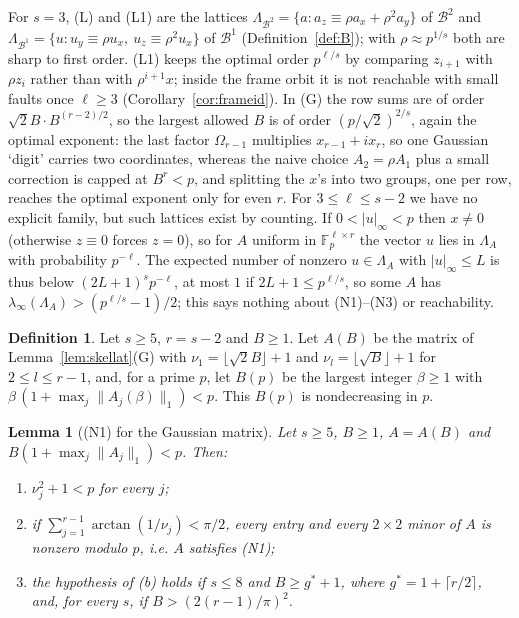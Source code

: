 \documentclass[11pt]{amsart}
\newtheorem{lemma}[theorem]{Lemma}
\theoremstyle{definition}
\newtheorem{definition}[theorem]{Definition}
\theoremstyle{plain}
\newcommand{\F}{\mathbb{F}}
\begin{document}
For $s=3$, (L) and (L1) are the lattices $\Lambda_{\mathcal B^2}=\{a:a_z\equiv\rho a_x+\rho^2a_y\}$ of $\mathcal B^2$ and $\Lambda_{\mathcal B^1}=\{u:u_y\equiv\rho u_x,\ u_z\equiv\rho^2u_x\}$ of $\mathcal B^1$ (Definition~\ref{def:B}); with $\rho\approx p^{1/s}$ both are sharp to first order. (L1) keeps the optimal order $p^{\ell/s}$ by comparing $z_{i+1}$ with $\rho z_i$ rather than with $\rho^{i+1}x$; inside the frame orbit it is not reachable with small faults once $\ell\ge3$ (Corollary~\ref{cor:frameid}). In (G) the row sums are of order $\sqrt2B\cdot B^{(r-2)/2}$, so the largest allowed $B$ is of order $(p/\sqrt2)^{2/s}$, again the optimal exponent: the last factor $\Omega_{r-1}$ multiplies $x_{r-1}+ix_r$, so one Gaussian `digit' carries two coordinates, whereas the naive choice $A_2=\rho A_1$ plus a small correction is capped at $B^r<p$, and splitting the $x$'s into two groups, one per row, reaches the optimal exponent only for even $r$. For $3\le \ell\le s-2$ we have no explicit family, but such lattices exist by counting. If $0<|u|_\infty<p$ then $x\ne0$ (otherwise $z\equiv0$ forces $z=0$), so for $A$ uniform in $\F_p^{\ell\times r}$ the vector $u$ lies in $\Lambda_A$ with probability $p^{-\ell}$. The expected number of nonzero $u\in\Lambda_A$ with $|u|_\infty\le L$ is thus below $(2L+1)^sp^{-\ell}$, at most $1$ if $2L+1\le p^{\ell/s}$, so some $A$ has $\lambda_\infty(\Lambda_A)>(p^{\ell/s}-1)/2$; this says nothing about (N1)--(N3) or reachability.

\begin{definition}\label{def:G2rule}
Let $s\ge5$, $r=s-2$ and $B\ge1$. Let $A(B)$ be the matrix of Lemma~\ref{lem:skellat}(G) with $\nu_1=\lfloor\sqrt2B\rfloor+1$ and $\nu_l=\lfloor\sqrt B\rfloor+1$ for $2\le l\le r-1$, and, for a prime $p$, let $B(p)$ be the largest integer $\beta\ge1$ with $\beta\,(1+\max_j\|A_j(\beta)\|_1)<p$. This $B(p)$ is nondecreasing in $p$.
\end{definition}

\begin{lemma}[(N1) for the Gaussian matrix]\label{lem:G2N1}
Let $s\ge5$, $B\ge1$, $A=A(B)$ and $B(1+\max_j\|A_j\|_1)<p$. Then:
\begin{enumerate}
\item[(a)] $\nu_j^2+1<p$ for every $j$;
\item[(b)] if $\sum_{j=1}^{r-1}\arctan(1/\nu_j)<\pi/2$, every entry and every $2\times2$ minor of $A$ is nonzero modulo $p$, i.e. $A$ satisfies (N1);
\item[(c)] the hypothesis of (b) holds if $s\le8$ and $B\ge g^*+1$, where $g^*=1+\lceil r/2\rceil$, and, for every $s$, if $B>(2(r-1)/\pi)^2$.
\end{enumerate}
\end{lemma}
\end{document}
